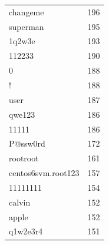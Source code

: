 \documentclass[12pt, oneside]{book}
\begin{document}
\begin{longtable}{|l|r|}
changeme&196\\ 
superman&195\\ 
1q2w3e&193\\ 
112233&190\\ 
0&188\\ 
!&188\\ 
user&187\\ 
qwe123&186\\ 
11111&186\\ 
P@ssw0rd&172\\ 
rootroot&161\\ 
centos6svm.root123&157\\ 
11111111&154\\ 
calvin&152\\ 
apple&152\\ 
q1w2e3r4&151\\ 
\end{longtable}
\newpage
\thispagestyle{empty}
\end{document}
